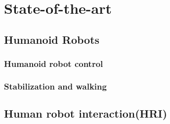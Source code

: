 \documentclass[a4paper, 12pt, oneside]{Thesis}  %
\begin{document}
%
%
%


\clearpage

{\color{blue}\chapter{State-of-the-art}\label{sota}}


\section{Humanoid Robots}
%	
%


\subsection{Humanoid robot control}


\subsection{Stabilization and walking}


\clearpage
\section{Human robot interaction(HRI)}
\end{document}

